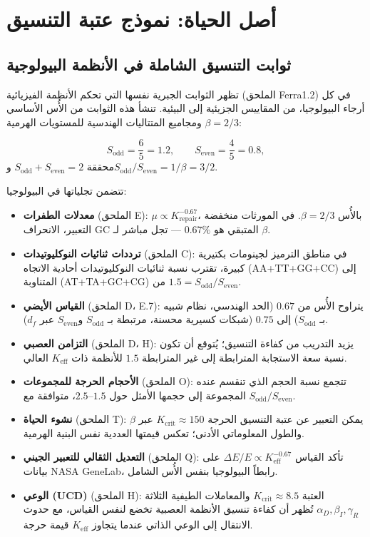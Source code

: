 \documentclass[11pt,a4paper]{article}
\begin{document}
	\section{أصل الحياة: نموذج عتبة التنسيق}
	\label{sec:origin-life}
	
	\subsection{ثوابت التنسيق الشاملة في الأنظمة البيولوجية}
	\label{subsec:bio-constants}
	
	تظهر الثوابت الجبرية نفسها التي تحكم الأنظمة الفيزيائية (الملحق Ferra1.2) في كل أرجاء البيولوجيا، من المقاييس الجزيئية إلى البيئية. تنشأ هذه الثوابت من الأُس الأساسي \(\beta = 2/3\) ومجاميع المتتاليات الهندسية للمستويات الهرمية:
	
	\[
	S_{\mathrm{odd}} = \frac{6}{5}=1.2,\qquad S_{\mathrm{even}} = \frac{4}{5}=0.8,
	\]
	محققة \(S_{\mathrm{odd}}+S_{\mathrm{even}}=2\) و\(S_{\mathrm{odd}}/S_{\mathrm{even}} = 1/\beta = 3/2\).
	
	تتضمن تجلياتها في البيولوجيا:
	
	\begin{itemize}
		\item \textbf{معدلات الطفرات} (الملحق E): \(\mu \propto K_{\mathrm{repair}}^{-0.67}\)، بالأُس \(\beta = 2/3\). في المورثات منخفضة التعبير، الانحراف GC المتبقي هو \(0.67\%\) — تجل مباشر لـ \(\beta\).
		\item \textbf{ترددات ثنائيات النوكليوتيدات} (الملحق C): في مناطق الترميز لجينومات بكتيرية كبيرة، تقترب نسبة ثنائيات النوكليوتيدات أحادية الاتجاه (AA+TT+GG+CC) إلى المتناوبة (AT+TA+GC+CG) من \(1.5 = S_{\mathrm{odd}}/S_{\mathrm{even}}\).
		\item \textbf{القياس الأيضي} (الملحق D، E.7): يتراوح الأُس من \(0.67\) (الحد الهندسي، نظام شبيه بـ \(S_{\mathrm{odd}}\)) إلى \(0.75\) (شبكات كسيرية محسنة، مرتبطة بـ \(S_{\mathrm{odd}}\) و\(S_{\mathrm{even}}\) عبر \(d_f\)).
		\item \textbf{التزامن العصبي} (الملحق D، H): يزيد التدريب من كفاءة التنسيق؛ يُتوقع أن تكون نسبة سعة الاستجابة المترابطة إلى غير المترابطة \(1.5\) للأنظمة ذات \(K_{\mathrm{eff}}\) العالي.
		\item \textbf{الأحجام الحرجة للمجموعات} (الملحق O): تتجمع نسبة الحجم الذي تنقسم عنده المجموعة إلى حجمها الأمثل حول \(1.5\)–\(2.5\)، متوافقة مع \(S_{\mathrm{odd}}/S_{\mathrm{even}}\).
		\item \textbf{نشوء الحياة} (الملحق T): يمكن التعبير عن عتبة التنسيق الحرجة \(K_{\mathrm{crit}} \approx 150\) عبر \(\beta\) والطول المعلوماتي الأدنى؛ تعكس قيمتها العددية نفس البنية الهرمية.
		\item \textbf{التعديل الثقالي للتعبير الجيني} (الملحق Q): تأكد القياس \(\Delta E/E \propto K_{\mathrm{eff}}^{-0.67}\) على بيانات NASA GeneLab، رابطاً البيولوجيا بنفس الأُس الشامل.
		\item \textbf{الوعي (UCD)} (الملحق H): العتبة \(K_{\mathrm{crit}} \approx 8.5\) والمعاملات الطيفية الثلاثة \(\alpha_D,\beta_I,\gamma_R\) تُظهر أن كفاءة تنسيق الأنظمة العصبية تخضع لنفس القياس، مع حدوث الانتقال إلى الوعي الذاتي عندما يتجاوز \(K_{\mathrm{eff}}\) قيمة حرجة.
	\end{itemize}
	
\end{document}

